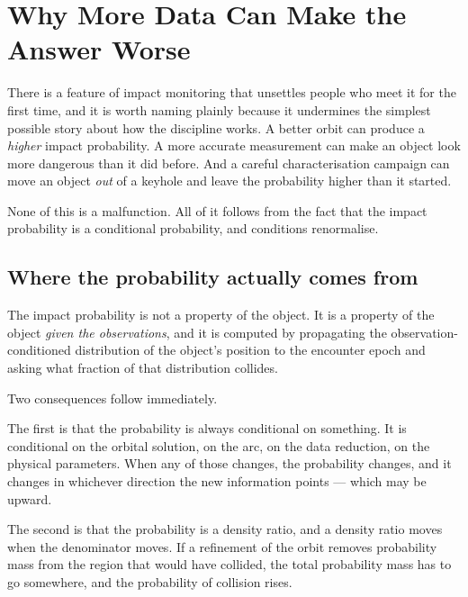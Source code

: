 
\chapter{Why More Data Can Make the Answer Worse}
\label{ch:more-data}

There is a feature of impact monitoring that unsettles people who meet it
for the first time, and it is worth naming plainly because it undermines the
simplest possible story about how the discipline works. A better orbit can
produce a \emph{higher} impact probability. A more accurate measurement can
make an object look more dangerous than it did before. And a careful
characterisation campaign can move an object \emph{out} of a keyhole and
leave the probability higher than it started.

None of this is a malfunction. All of it follows from the fact that the
impact probability is a conditional probability, and conditions renormalise.

\section{Where the probability actually comes from}

The impact probability is not a property of the object. It is a property of
the object \emph{given the observations}, and it is computed by propagating
the observation-conditioned distribution of the object's position to the
encounter epoch and asking what fraction of that distribution collides.

Two consequences follow immediately.

The first is that the probability is always conditional on something. It is
conditional on the orbital solution, on the arc, on the data reduction, on
the physical parameters. When any of those changes, the probability changes,
and it changes in whichever direction the new information points --- which
may be upward.

The second is that the probability is a density ratio, and a density ratio
moves when the denominator moves. If a refinement of the orbit removes
probability mass from the region that would have collided, the total
probability mass has to go somewhere, and the probability of collision rises.

